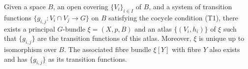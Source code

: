 Given a space $B$, an open covering $\{V_i\}_{i \in I}$ of $B$, and a system of transition functions $\{g_{i,j}: V_i \cap V_j \to G\}$ on $B$ satisfying the cocycle condition (T1), there exists a principal $G$-bundle $\xi = (X, p, B)$ and an atlas $\{(V_i, h_i)\}$ of $\xi$ such that $\{g_{i,j}\}$ are the transition functions of this atlas. Moreover, $\xi$ is unique up to isomorphism over $B$. The associated fibre bundle $\xi[Y]$ with fibre $Y$ also exists and has $\{g_{i,j}\}$ as its transition functions.
